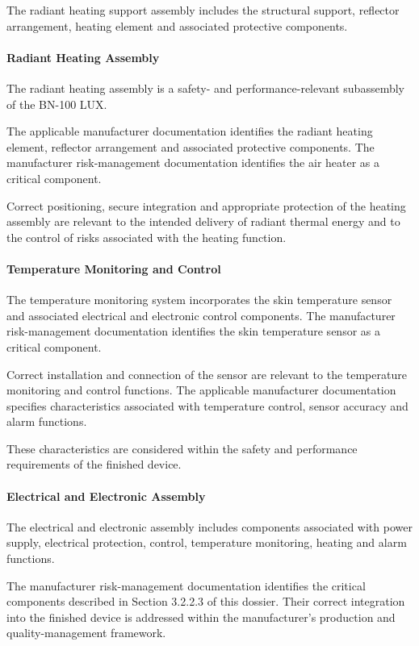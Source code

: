 The radiant heating support assembly includes the structural
support, reflector arrangement, heating element and associated
protective components.

\paragraph{Radiant Heating Assembly}

The radiant heating assembly is a safety- and performance-relevant
subassembly of the BN-100 LUX.

The applicable manufacturer documentation identifies the radiant
heating element, reflector arrangement and associated protective
components. The manufacturer risk-management documentation
identifies the air heater as a critical component.

Correct positioning, secure integration and appropriate protection
of the heating assembly are relevant to the intended delivery of
radiant thermal energy and to the control of risks associated with
the heating function.

\paragraph{Temperature Monitoring and Control}

The temperature monitoring system incorporates the skin temperature
sensor and associated electrical and electronic control components.
The manufacturer risk-management documentation identifies the
skin temperature sensor as a critical component.

Correct installation and connection of the sensor are relevant
to the temperature monitoring and control functions. The applicable
manufacturer documentation specifies characteristics associated
with temperature control, sensor accuracy and alarm functions.

These characteristics are considered within the safety and
performance requirements of the finished device.

\paragraph{Electrical and Electronic Assembly}

The electrical and electronic assembly includes components
associated with power supply, electrical protection, control,
temperature monitoring, heating and alarm functions.

The manufacturer risk-management documentation identifies the
critical components described in Section 3.2.2.3 of this dossier.
Their correct integration into the finished device is addressed
within the manufacturer's production and quality-management
framework.

